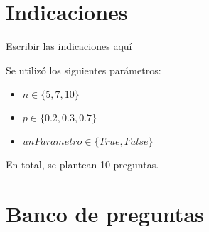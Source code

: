 \documentclass[a4,11pt]{aleph-notas}
\begin{document}
\encabezado

\section{Indicaciones}

Escribir las indicaciones aquí



Se utilizó los siguientes parámetros:
\begin{itemize}
	\item $n \in \{5, 7, 10\}$
	\item $p \in \{0.2, 0.3, 0.7\}$
	\item $unParametro \in \{True, False\}$

\end{itemize}
En total, se plantean 10 preguntas.


\section{Banco de preguntas}
\end{document}

